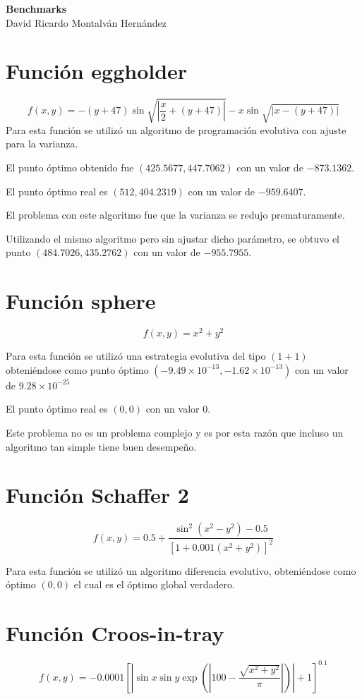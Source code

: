 \documentclass[10pt,letterpaper]{article}
\author{David Ricardo Montalván Hernández}
\begin{document}
	\begin{center}
	\textbf{Benchmarks}\\
	David Ricardo Montalván Hernández
	\end{center}

\section{Función eggholder}
$$f(x,y) = -(y+47) \sin{\sqrt{\left| \dfrac{x}{2} + (y+47)\right|} }
- x\sin{\sqrt{\left| x - (y+47) \right|}} $$
Para esta función se utilizó un algoritmo de programación evolutiva con ajuste para la varianza.

El punto óptimo obtenido fue $(425.5677,447.7062)$ con un valor de $-873.1362$.

El punto óptimo real es $(512,404.2319)$ con un valor de $-959.6407$.

El problema con este algoritmo fue que la varianza se redujo prematuramente.

Utilizando el mismo algoritmo pero sin ajustar dicho parámetro, se obtuvo el punto $(484.7026,435.2762)$ con un valor de $-955.7955$.

\section{Función sphere}
$$f(x,y)=x^{2} + y^{2}$$

Para esta función se utilizó una estrategia evolutiva del tipo $(1+1)$
obteniéndose como punto óptimo $(-9.49 \times 10^{-13}, -1.62 \times 10^{-13}) $ con un valor de $9.28 \times 10 ^{-25}$

El punto óptimo real es $(0,0)$ con un valor $0$.

Este problema no es un problema complejo y es por esta razón que incluso un algoritmo tan simple tiene buen desempeño.

\section{Función Schaffer 2}

$$f(x,y) = 0.5 + \dfrac{\sin^2({x^2-y^2})- 0.5}{\left[ 1 + 0.001(x^2 + y^2) \right]^2} $$

Para esta función se utilizó un algoritmo diferencia evolutivo, obteniéndose como óptimo $(0,0)$ el cual es el óptimo global verdadero.

\section{Función Croos-in-tray}
$$f(x,y)= -0.0001 \left[ \left| \sin x \sin y \exp{\left( \left| 100 
-  \dfrac{\sqrt {x^2 + y^2} } {\pi} \right| \right)} \right| +
1 \right]^{0.1} $$ 
\end{document}
